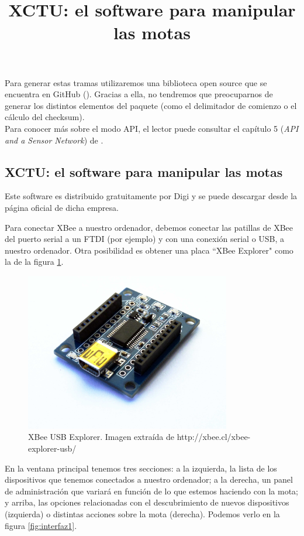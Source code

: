 Para generar estas tramas utilizaremos una biblioteca open source que se encuentra en GitHub (\cite{libraryArduinoXBee}).
Gracias a ella, no tendremos que preocuparnos de generar los distintos elementos del paquete
(como el delimitador de comienzo o el cálculo del checksum).\\

Para conocer más sobre el modo API, el lector puede consultar el capítulo 5 (\textit{API and a Sensor Network}) de \cite{faludi}.\\

\subsection{XCTU: el software para manipular las motas}
\title{XCTU: el software para manipular las motas}
\label{xctu}
Este software es distribuido gratuitamente por Digi \cite{licenciaXCTU} y se puede descargar desde la página oficial
de dicha empresa.

Para conectar XBee a nuestro ordenador, debemos conectar las patillas de XBee del puerto serial a un
FTDI (por ejemplo) y con una conexión serial o USB, a nuestro ordenador. Otra posibilidad es obtener
una placa ``XBee Explorer" como la de la figura \ref{fig:xbeeexplorer}.


\begin{figure}[htb]
\centering
\includegraphics[width=0.8\textwidth]{./imagenes/xbeeexplorer}
\caption{XBee USB Explorer. Imagen extraída de \scriptsize{http://xbee.cl/xbee-explorer-usb/}} \label{fig:xbeeexplorer}
\end{figure}


En la ventana principal tenemos tres secciones: a la izquierda, la lista de los dispositivos
que tenemos conectados a nuestro ordenador; a la derecha, un panel de administración que variará
en función de lo que estemos haciendo con la mota; y arriba, las opciones relacionadas con el descubrimiento
de nuevos dispositivos (izquierda) o distintas acciones sobre la mota (derecha). Podemos verlo en la figura \ref{fig:interfaz1}.\\

